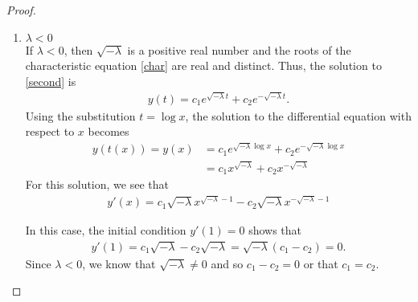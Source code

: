 \documentclass[12pt]{article}
\theoremstyle{definition}
\newenvironment{case}{%
  \let\olditem\item%
  \renewcommand\item[1][]{\olditem \textbf{##1} \\}%
  \begin{enumerate}[label=\textbf{Case \arabic*:},itemindent=*,leftmargin=0em]}{\end{enumerate}%
}
\begin{document}
\begin{proof}
  \begin{case}
    \item[$\lambda < 0$] If $\lambda < 0$, then $\sqrt{-\lambda}$ is a positive real number
      and the roots of the characteristic equation \eqref{char} are real and distinct.
      Thus, the solution to \eqref{second} is
      \begin{align*}
        y(t) = c_1 e^{\sqrt{-\lambda}t} + c_2 e^{-\sqrt{-\lambda}t}.
      \end{align*}
      Using the substitution $t = \log x$, the solution to the differential
      equation with respect to $x$ becomes
      \begin{align*}
        y(t(x)) = y(x)
        &= c_1 e^{\sqrt{-\lambda}\log x} + c_2 e^{-\sqrt{-\lambda}\log x} \\
        &= c_1 x^{\sqrt{-\lambda}} + c_2 x^{-\sqrt{-\lambda}}
      \end{align*}
      For this solution, we see that
      \begin{align*}
        y'(x) = c_1\sqrt{-\lambda} x^{\sqrt{-\lambda} - 1} - c_2\sqrt{-\lambda} x^{-\sqrt{-\lambda} - 1}
      \end{align*}

      In this case, the initial condition $y'(1) = 0$ shows that
      \begin{align*}
        y'(1) = c_1 \sqrt{-\lambda} - c_2 \sqrt{-\lambda} = \sqrt{-\lambda}(c_1 - c_2) = 0.
      \end{align*}
      Since $\lambda < 0$, we know that $\sqrt{-\lambda} \neq 0$ and so $c_1 - c_2 = 0$
      or that $c_1 = c_2$.


\end{case}
\end{proof}
\end{document}

